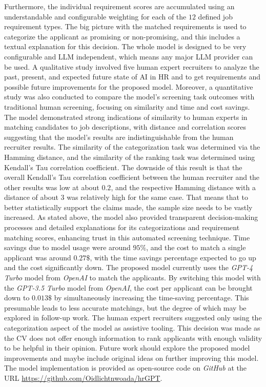 \documentclass[draft,final]{thesisclass} %
\begin{document}
Furthermore, the individual requirement scores are accumulated using an understandable and configurable weighting for each of the $12$ defined job requirement types. The big picture with the matched requirements is used to categorize the applicant as promising or non-promising, and this includes a textual explanation for this decision. The whole model is designed to be very configurable and \gls{LLM} independent, which means any major \gls{LLM} provider can be used. A qualitative study involved five human expert recruiters to analyze the past, present, and expected future state of \acs{AI} in \acs{HR} and to get requirements and possible future improvements for the proposed model. Moreover, a quantitative study was also conducted to compare the model's screening task outcomes with traditional human screening, focusing on similarity and time and cost savings. The model demonstrated strong indications of similarity to human experts in matching candidates to job descriptions, with distance and correlation scores suggesting that the model's results are indistinguishable from the human recruiter results. The similarity of the categorization task was determined via the Hamming distance, and the similarity of the ranking task was determined using Kendall's Tau correlation coefficient. The downside of this result is that the overall Kendall's Tau correlation coefficient between the human recruiter and the other results was low at about $0.2$, and the respective Hamming distance with a distance of about $3$ was relatively high for the same case. That means that to better statistically support the claims made, the sample size needs to be vastly increased. As stated above, the model also provided transparent decision-making processes and detailed explanations for its categorizations and requirement matching scores, enhancing trust in this automated screening technique. Time savings due to model usage were around $95\%$, and the cost to match a single applicant was around $0.27\$$, with the time savings percentage expected to go up and the cost significantly down.
The proposed model currently uses the \textit{GPT-4 Turbo} model from \textit{OpenAI} to match the applicants. By switching this model with the \textit{GPT-3.5 Turbo} model from \textit{OpenAI}, the cost per applicant can be brought down to $0.013\$$ by simultaneously increasing the time-saving percentage. This presumable leads to less accurate matchings, but the degree of which may be explored in follow-up work. The human expert recruiters suggested only using the categorization aspect of the model as assistive tooling. This decision was made as the \acs{CV} does not offer enough information to rank applicants with enough validity to be helpful in their opinion. Future work should explore the proposed model improvements and maybe include original ideas on further improving this model. The model implementation is provided as open-source code on \textit{GitHub} at the URL \url{https://github.com/Oidlichtnwoada/hrGPT}.
\end{document}
